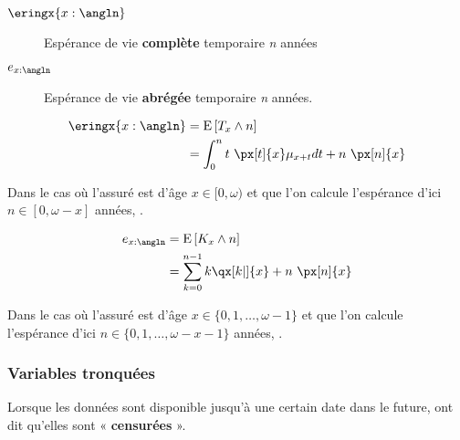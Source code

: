 \documentclass[10pt, french]{article}
\begin{document}
\begin{multicols*}{3}
\begin{distributions}[Notation]
\begin{description}
	\item[$\eringx{x:\angln}$]	Espérance de vie \textbf{complète} temporaire \textit{n} années
	\item[$e_{x:\angln}$]	Espérance de vie \textbf{abrégée} temporaire \textit{n} années.
\end{description}
\end{distributions}


\begin{definitionNOHFILLsub}
\begin{align*}
	\eringx{x:\angln} 
	&=	\esp{T_x \wedge n} \\
	&=	\int_0^{n}t \ \px[t]{x} \mu_{x + t} dt + n \ \px[n]{x} \\
\end{align*}

Dans le cas où l'assuré est d'âge  $x \in [0, \omega)$ et que l'on calcule l'espérance d'ici $n \in [0, \omega - x]$ années, .
\end{definitionNOHFILLsub}


\begin{definitionNOHFILLsub}
\begin{align*}
	e_{x:\angln} 
	&=	\esp{K_x \wedge n} \\
	&=	\sum_{k = 0}^{n - 1} k \qx[k | ]{x} + n \ \px[n]{x}	\\ 
\end{align*}

Dans le cas où l'assuré est d'âge  $x \in \{0, 1, \dots, \omega - 1\}$ et que l'on calcule l'espérance d'ici $n \in \{0, 1, \dots, \omega - x - 1\}$ années, .
\end{definitionNOHFILLsub}


\subsubsection{Variables tronquées}
\begin{rappel_enhanced}[Contexte]
Lorsque les données sont disponible jusqu'à une certain date dans le future, ont dit qu'elles sont « \textbf{censurées} ». \\


\end{rappel_enhanced}
\end{multicols*}
\end{document}
